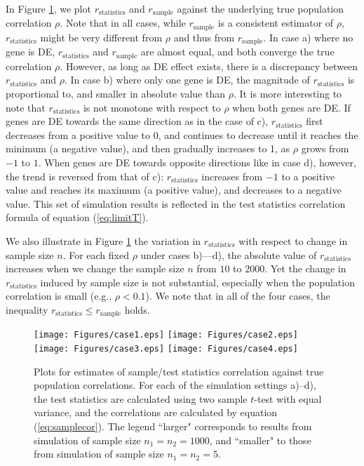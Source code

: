 \documentclass[12pt, a4paper]{article}
\begin{document}
	In Figure \ref{fig:tstat}, we plot $r_\text{statistics}$ and $r_{\text{sample}}$ against the 
	underlying true population correlation $\rho$. Note that in all cases, while 
	$r_{\text{sample}}$ is a consistent estimator of $\rho$, $r_\text{statistics}$ might be very 
	different from $\rho$ and thus from $r_\text{sample}$.  
	In case a) where no gene is DE, $r_\text{statistics}$ and $r_{\text{sample}}$ are almost equal, 
	and both converge the true correlation $\rho$. However, as long as DE effect exists, there is a 
	discrepancy between $r_\text{statistics}$ and $\rho$. In case b) where only one gene is DE, 
	 the magnitude of $r_\text{statistics}$ is proportional to, and smaller in absolute value than 
	 $\rho$.
	It is more interesting to note that $r_\text{statistics}$ is not monotone with respect to 
	$\rho$ when both genes are DE. If genes are DE towards the same direction as in the case of 
	c),  $r_\text{statistics}$ first decreases from a positive value to 0, and continues to 
	decrease until it reaches the minimum (a negative value), and then gradually increases to 1, as 
	$\rho$ grows from $-1$ to $1$. When genes are DE towards opposite directions like in case d), 
	however, the trend is reversed from that of c): $r_\text{statistics}$ increases from $-1$ to a 
	positive value and reaches its maximum (a positive value), and decreases to a negative value. 
	This set of simulation results is reflected in the test statistics correlation formula of 
	equation (\ref{eq:limitT}). 
	
	We also illustrate in Figure \ref{fig:tstat} the variation in $r_\text{statistics}$ with 
	respect to change in sample size $n$. For each fixed $\rho$ under cases b)---d), the absolute 
	value of $r_\text{statistics}$  increases when we change the sample size $n$ from $10$ to 
	$2000$. Yet the change in $r_\text{statistics}$ induced by sample size is not substantial, 
	especially when the population correlation is small (e.g., $\rho < 0.1$). We note that in all 
	of the four cases, the inequality $r_\text{statistics}\leq r_\text{sample}$ holds.
	
	\begin{figure}[!ht]
		\centering
		\texttt{[image: Figures/case1.eps]}
		\texttt{[image: Figures/case2.eps]}
		\texttt{[image: Figures/case3.eps]}
		\texttt{[image: Figures/case4.eps]}
	\caption{Plots for estimates of sample/test statistics correlation against true population 
	correlations. For each of the simulation settings a)--d), the test statistics are calculated 
	using two sample $t$-test with equal variance, and the correlations are calculated by equation 
	(\ref{eq:samplecor}). The legend ``larger" corresponds to results from simulation of sample 
	size $n_1=n_2 =1000$, and ``smaller" to those from simulation of sample size $n_1 = n_2 =5$.}
		\label{fig:tstat}
	\end{figure}
\end{document}
